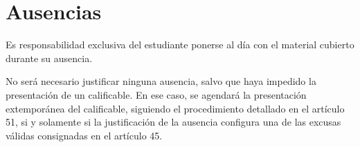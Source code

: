 \section{Ausencias}
Es responsabilidad exclusiva del estudiante ponerse al día con el material cubierto durante su ausencia.

No será necesario justificar ninguna ausencia, salvo que haya impedido la presentación de un calificable. En ese caso, se agendará la presentación extemporánea del calificable, siguiendo el procedimiento detallado en el artículo 51, si y solamente si la justificación de la ausencia configura una de las excusas válidas consignadas en el artículo 45.

